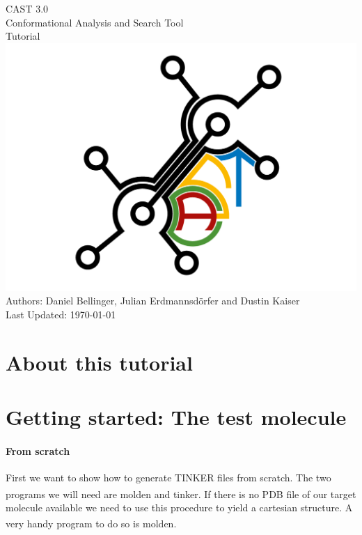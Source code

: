\documentclass[a4paper,11pt]{scrartcl}
\newcommand{\myCite}[1]{\textsuperscript{\cite{#1}}}
\begin{document}
\begin{titlepage}
	\begin{titlepage}
		\begin{center}
			\Huge{CAST 3.0}\\
			\Large{Conformational Analysis and Search Tool}\\[.5cm]
			\Huge{Tutorial}\\[1cm]
			\includegraphics[width=.7\textwidth]{LOGO}\\[1cm]
			\Large{Authors: Daniel Bellinger, Julian Erdmannsdörfer and Dustin Kaiser\\[1cm]
				Last Updated: \today }
		\end{center}
	\end{titlepage}
\end{titlepage}

\setcounter{tocdepth}{4}
\tableofcontents
	
\newpage

\section{About this tutorial}

\section{Getting started: The test molecule}
\label{sec:gettingstarted}

\paragraph{From scratch}First we want to show how to generate TINKER files from scratch. The two programs we will need are molden\myCite{MOLDEN} and tinker. If there is no PDB file of our target molecule available we need to use this procedure to yield a cartesian structure. A very handy program to do so is molden\myCite{MOLDEN}.
\end{document}
